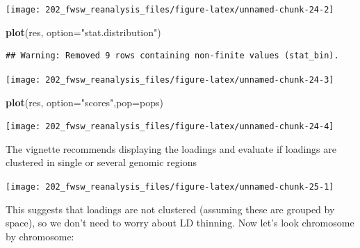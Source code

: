 \documentclass[]{article}
\newenvironment{Shaded}{\begin{snugshade}}{\end{snugshade}}
\newcommand{\KeywordTok}[1]{\textcolor[rgb]{0.13,0.29,0.53}{\textbf{#1}}}
\newcommand{\DataTypeTok}[1]{\textcolor[rgb]{0.13,0.29,0.53}{#1}}
\newcommand{\DecValTok}[1]{\textcolor[rgb]{0.00,0.00,0.81}{#1}}
\newcommand{\FloatTok}[1]{\textcolor[rgb]{0.00,0.00,0.81}{#1}}
\newcommand{\StringTok}[1]{\textcolor[rgb]{0.31,0.60,0.02}{#1}}
\newcommand{\ControlFlowTok}[1]{\textcolor[rgb]{0.13,0.29,0.53}{\textbf{#1}}}
\newcommand{\OperatorTok}[1]{\textcolor[rgb]{0.81,0.36,0.00}{\textbf{#1}}}
\newcommand{\NormalTok}[1]{#1}
\begin{document}
\texttt{[image: 202\_fwsw\_reanalysis\_files/figure-latex/unnamed-chunk-24-2]}

\begin{Shaded}
\begin{Highlighting}[]
\KeywordTok{plot}\NormalTok{(res, }\DataTypeTok{option=}\StringTok{"stat.distribution"}\NormalTok{)}
\end{Highlighting}
\end{Shaded}

\begin{verbatim}
## Warning: Removed 9 rows containing non-finite values (stat_bin).
\end{verbatim}

\texttt{[image: 202\_fwsw\_reanalysis\_files/figure-latex/unnamed-chunk-24-3]}

\begin{Shaded}
\begin{Highlighting}[]
\KeywordTok{plot}\NormalTok{(res, }\DataTypeTok{option=}\StringTok{"scores"}\NormalTok{,}\DataTypeTok{pop=}\NormalTok{pops)}
\end{Highlighting}
\end{Shaded}

\texttt{[image: 202\_fwsw\_reanalysis\_files/figure-latex/unnamed-chunk-24-4]}

The vignette recommends displaying the loadings and evaluate if loadings
are clustered in single or several genomic regions

\begin{Shaded}
\end{Shaded}

\texttt{[image: 202\_fwsw\_reanalysis\_files/figure-latex/unnamed-chunk-25-1]}

This suggests that loadings are not clustered (assuming these are
grouped by space), so we don't need to worry about LD thinning. Now
let's look chromosome by chromosome:
\end{document}
